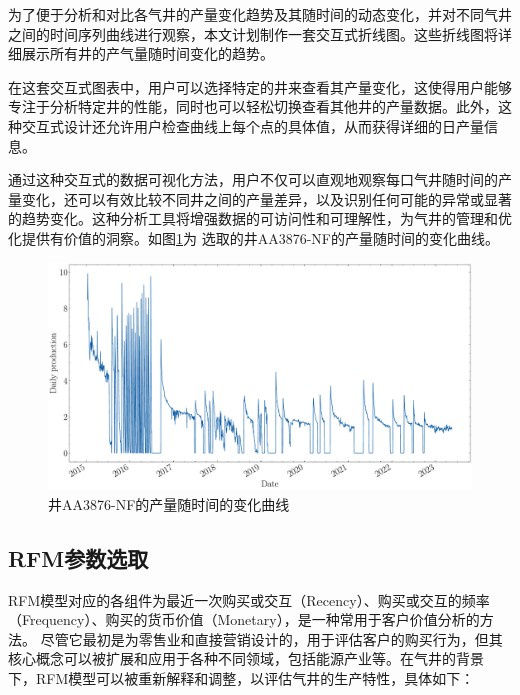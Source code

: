 为了便于分析和对比各气井的产量变化趋势及其随时间的动态变化，并对不同气井之间的时间序列曲线进行观察，本文计划制作一套交互式折线图。这些折线图将详细展示所有井的产气量随时间变化的趋势。

在这套交互式图表中，用户可以选择特定的井来查看其产量变化，这使得用户能够专注于分析特定井的性能，同时也可以轻松切换查看其他井的产量数据。此外，这种交互式设计还允许用户检查曲线上每个点的具体值，从而获得详细的日产量信息。

通过这种交互式的数据可视化方法，用户不仅可以直观地观察每口气井随时间的产量变化，还可以有效比较不同井之间的产量差异，以及识别任何可能的异常或显著的趋势变化。这种分析工具将增强数据的可访问性和可理解性，为气井的管理和优化提供有价值的洞察。如图\ref{fig:dailychange}为
选取的井AA3876-NF的产量随时间的变化曲线。
\begin{figure}[H]
    \centering
    \includegraphics[width=.9\linewidth]{figure/DailyProduction_SN0004-04.pdf}
    \caption{井AA3876-NF的产量随时间的变化曲线}
    \label{fig:dailychange}
\end{figure}


\subsection{RFM参数选取}
RFM模型对应的各组件为最近一次购买或交互（Recency）、购买或交互的频率（Frequency）、购买的货币价值（Monetary），是一种常用于客户价值分析的方法。
尽管它最初是为零售业和直接营销设计的，用于评估客户的购买行为，但其核心概念可以被扩展和应用于各种不同领域，包括能源产业等。在气井的背景
下，RFM模型可以被重新解释和调整，以评估气井的生产特性，具体如下：

